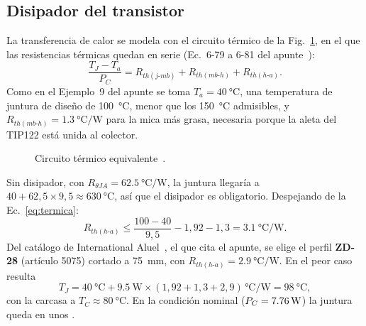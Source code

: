 \subsection{Disipador del transistor}
La transferencia de calor se modela con el circuito térmico de la Fig.~\ref{fig:circuito_termico}, en el que las resistencias térmicas quedan en serie (Ec.~6-79 a 6-81 del apunte~\cite{ap2}):
\begin{equation}
    \frac{T_J - T_a}{P_C} = R_{th(j\text{-}mb)} + R_{th(mb\text{-}h)} + R_{th(h\text{-}a)}.
    \label{eq:termica}
\end{equation}
Como en el Ejemplo~9 del apunte se toma $T_a = \SI{40}{\celsius}$, una temperatura de juntura de diseño de \SI{100}{\celsius}, menor que los \SI{150}{\celsius} admisibles, y $R_{th(mb\text{-}h)} = \SI{1,3}{\celsius\per\watt}$ para la mica más grasa, necesaria porque la aleta del TIP122 está unida al colector.

\begin{figure}[!htb]
\centering
{}
\caption{Circuito térmico equivalente~\cite[Fig.~6-44]{ap2}.}
\label{fig:circuito_termico}
\end{figure}

Sin disipador, con $R_{\theta JA} = \SI{62,5}{\celsius\per\watt}$, la juntura llegaría a $40 + 62{,}5 \times 9{,}5 \approx \SI{630}{\celsius}$, así que el disipador es obligatorio. Despejando de la Ec.~\eqref{eq:termica}:
\begin{equation}
    R_{th(h\text{-}a)} \leq \frac{100 - 40}{9{,}5} - 1{,}92 - 1{,}3 = \SI{3,1}{\celsius\per\watt}.
\end{equation}
Del catálogo de International Aluel~\cite{aluel}, el que cita el apunte, se elige el perfil \textbf{ZD-28} (artículo 5075) cortado a \SI{75}{\milli\meter}, con $R_{th(h\text{-}a)} = \SI{2,9}{\celsius\per\watt}$. En el peor caso resulta
\begin{equation}
    T_J = \SI{40}{\celsius} + \SI{9,5}{\watt} \times (1{,}92 + 1{,}3 + 2{,}9)\,\si{\celsius\per\watt} = \SI{98}{\celsius},
\end{equation}
con la carcasa a $T_C \approx \SI{80}{\celsius}$. En la condición nominal ($P_C = \valu{2}{\simPqVeinticinco}{\watt}$) la juntura queda en unos .

